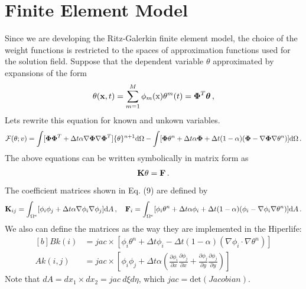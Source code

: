 \documentclass[]{article}
\begin{document}
\section{Finite Element Model} \label{sec: fem}
Since we are developing the Ritz-Galerkin finite element model, the choice of the weight functions is restricted to the spaces of approximation functions used for the solution field. Suppose that the dependent variable $\theta$ approximated by expansions of the form
\begin{equation}\label{eq11}
	\begin{aligned}
		\theta(\mathbf{x}, t)= \sum_{m=1}^{M} \phi_m(\mathrm{x}) \mathbf{\theta}^m(t) = \boldsymbol{\Phi}^T\boldsymbol{\theta} \thinspace,
	\end{aligned}
\end{equation}
Lets rewrite this equation for known and unkown variables.
\begin{equation}\label{eq12}
	\begin{aligned}[b]
		\mathcal{F}(\theta; v)=\int [\boldsymbol{\Phi}\boldsymbol{\Phi}^T + \Delta t \alpha\nabla\boldsymbol{\Phi}\nabla\boldsymbol{\Phi}^T]\{\theta\}^{n+1} \mathrm{d} \Omega - \int  [\boldsymbol{\Phi}\theta^{n}+\Delta t \alpha \boldsymbol{\Phi} + \Delta t (1-\alpha) (\boldsymbol{\Phi} - \nabla \boldsymbol{\Phi} \nabla\theta^n)]\mathrm{d} \Omega\thinspace.
	\end{aligned}
\end{equation}
The above equations can be written symbolically in matrix form as
\begin{equation}\label{eq13}
	\begin{aligned}
		\mathbf{K}\mathbf{\theta} = \mathbf{F}\thinspace.
	\end{aligned}
\end{equation}
The coefficient matrices shown in Eq. (9) are defined by
\begin{equation}\label{eq14}
	\begin{aligned}
		\mathbf{K}_{ij} = \int_{\Omega^e} [\phi_i\phi_j + \Delta t \alpha\nabla\phi_i\nabla\phi_j]\mathrm{d}A\thinspace, \quad
		\mathbf{F}_i =\int_{\Omega^e} [\phi_i\theta^{n}+\Delta t \alpha \phi_i + \Delta t (1-\alpha) (\phi_i - \nabla \phi_i \nabla\theta^n)]\mathrm{d}A \thinspace.
	\end{aligned}
\end{equation}
We also can define the matrices as the way they are implemented in the Hiperlife:
\begin{equation}\label{eq15}
	\begin{aligned}[b]
		Bk (i) &= jac \times [\phi_i \theta^n + \Delta t  \phi_i - \Delta t (1-\alpha)(\nabla \phi_i \cdot \nabla \theta^n)] \\
		Ak (i,j) &=  jac \times [\phi_i\phi_j + \Delta t \alpha(\frac{\partial \phi_i}{\partial x}
		\frac{\partial \phi_j}{\partial x} + \frac{\partial \phi_j}{\partial y} 
		\frac{\partial \phi_j}{\partial y})]  
	\end{aligned}
\end{equation}
Note that $dA=dx_{1} \times dx_{2}=jac \ d\xi d\eta$, which $jac=\mathrm{det}(Jacobian)$.
\end{document}

